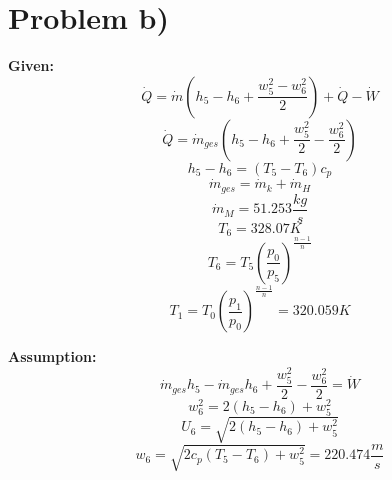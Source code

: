 \section*{Problem b)}

\textbf{Given:} \\
\[
\dot{Q} = \dot{m}(h_5 - h_6 + \frac{w_5^2 - w_6^2}{2}) + \dot{Q} - \dot{W}
\]
\[
\dot{Q} = \dot{m}_{ges}(h_5 - h_6 + \frac{w_5^2}{2} - \frac{w_6^2}{2})
\]
\[
h_5 - h_6 = (T_5 - T_6)c_p
\]
\[
\dot{m}_{ges} = \dot{m}_k + \dot{m}_H
\]
\[
\dot{m}_M = 51.253 \frac{kg}{s}
\]
\[
T_6 = 328.07 K
\]
\[
T_6 = T_5 \left( \frac{p_0}{p_5} \right)^{\frac{n-1}{n}}
\]
\[
T_1 = T_0 \left( \frac{p_1}{p_0} \right)^{\frac{n-1}{n}} = 320.059 K
\]

\textbf{Assumption:} \\
\[
\dot{m}_{ges} h_5 - \dot{m}_{ges} h_6 + \frac{w_5^2}{2} - \frac{w_6^2}{2} = \dot{W}
\]
\[
w_6^2 = 2(h_5 - h_6) + w_5^2
\]
\[
U_6 = \sqrt{2(h_5 - h_6) + w_5^2}
\]
\[
w_6 = \sqrt{2c_p(T_5 - T_6) + w_5^2} = 220.474 \frac{m}{s}
\]